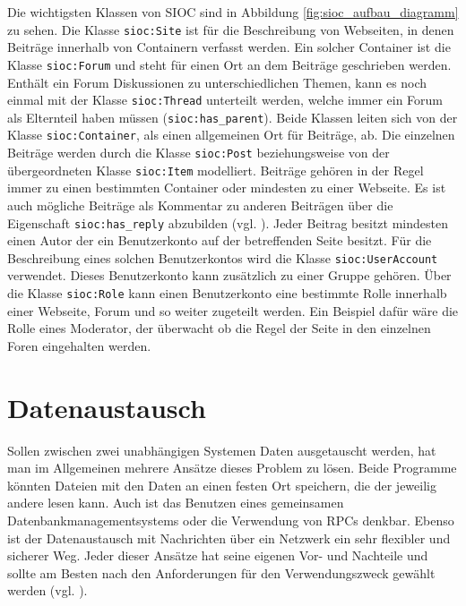 Die wichtigsten Klassen von SIOC sind in Abbildung \ref{fig:sioc_aufbau_diagramm} zu sehen. Die Klasse \texttt{sioc:Site} ist für die Beschreibung von Webseiten, in denen Beiträge innerhalb von Containern verfasst werden. Ein solcher Container ist die Klasse \texttt{sioc:Forum} und steht für einen Ort an dem Beiträge geschrieben werden. Enthält ein Forum Diskussionen zu unterschiedlichen Themen, kann es noch einmal mit der Klasse \texttt{sioc:Thread} unterteilt werden, welche immer ein Forum als Elternteil haben müssen (\texttt{sioc:has\_parent}). Beide Klassen leiten sich von der Klasse \texttt{sioc:Container}, als einen allgemeinen Ort für Beiträge, ab. Die einzelnen Beiträge werden durch die Klasse \texttt{sioc:Post} beziehungsweise von der übergeordneten Klasse \texttt{sioc:Item} modelliert. Beiträge gehören in der Regel immer zu einen bestimmten Container oder mindesten zu einer Webseite. Es ist auch mögliche Beiträge als Kommentar zu anderen Beiträgen über die Eigenschaft \texttt{sioc:has\_reply} abzubilden (vgl. \cite[S.\,203ff]{Breslin2009}). Jeder Beitrag besitzt mindesten einen Autor der ein Benutzerkonto auf der betreffenden Seite besitzt. Für die Beschreibung eines solchen Benutzerkontos wird die Klasse \texttt{sioc:UserAccount} verwendet. Dieses Benutzerkonto kann zusätzlich zu einer Gruppe gehören. Über die Klasse \texttt{sioc:Role} kann einen Benutzerkonto eine bestimmte Rolle innerhalb einer Webseite, Forum und so weiter zugeteilt werden. Ein Beispiel dafür wäre die Rolle eines Moderator, der überwacht ob die Regel der Seite in den einzelnen Foren eingehalten werden.




\section{Datenaustausch} %
\label{sec:datenverteilung}

Sollen zwischen zwei unabhängigen Systemen Daten ausgetauscht werden, hat man im Allgemeinen mehrere Ansätze dieses Problem zu lösen. Beide Programme könnten Dateien mit den Daten an einen festen Ort speichern, die der jeweilig andere lesen kann. Auch ist das Benutzen eines gemeinsamen Datenbankmanagementsystems oder die Verwendung von RPCs denkbar. Ebenso ist der Datenaustausch mit Nachrichten über ein Netzwerk ein sehr flexibler und sicherer Weg. Jeder dieser Ansätze hat seine eigenen Vor- und Nachteile und sollte am Besten nach den Anforderungen für den Verwendungszweck gewählt werden (vgl. \cite[S.\,12]{Hohpe:2003:EIP:940308}). 

